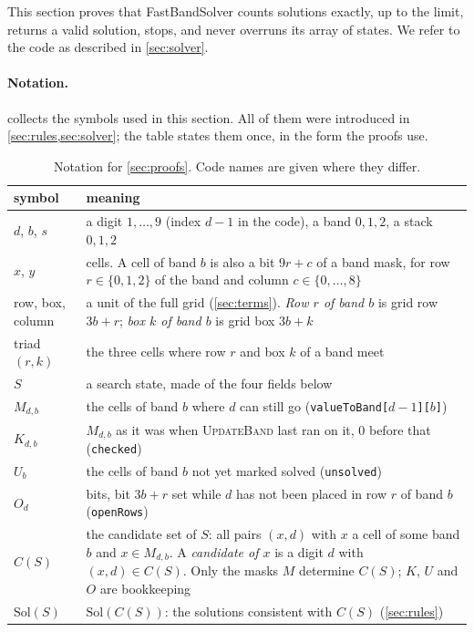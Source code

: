 \documentclass[11pt]{article}
\theoremstyle{definition}
\theoremstyle{plain}
\let\origtextsc\textsc
\renewcommand{\textsc}[1]{\textup{\origtextsc{#1}}}
\begin{document}
This section proves that FastBandSolver counts solutions exactly, up to the limit, returns a valid solution, stops,
and never overruns its array of states. We refer to the code as described in \cref{sec:solver}.

\paragraph{Notation.}  collects the symbols used in this section. All of them were introduced in
\cref{sec:rules,sec:solver}; the table states them once, in the form the proofs use.

\begin{table}[h!]
\centering
\caption{Notation for \cref{sec:proofs}. Code names are given where they differ.}
\label{tab:notation}
\small
\begin{tabular}{l>{\raggedright\arraybackslash}p{11.2cm}}
\toprule
symbol & meaning \\
\midrule
$d$, $b$, $s$ & a digit $1,\dots,9$ (index $d-1$ in the code), a band $0,1,2$, a stack $0,1,2$ \\
$x$, $y$ & cells. A cell of band $b$ is also a bit $9r+c$ of a band mask, for row $r\in\{0,1,2\}$ of the band and
  column $c\in\{0,\dots,8\}$ \\
row, box, column & a unit of the full grid (\cref{sec:terms}). \emph{Row $r$ of band $b$} is grid row $3b+r$; \emph{box $k$ of band $b$} is grid box $3b+k$ \\
triad $(r,k)$ & the three cells where row $r$ and box $k$ of a band meet \\
$S$ & a search state, made of the four fields below \\
$M_{d,b}$ & the cells of band $b$ where $d$ can still go (\texttt{valueToBand[$d-1$][$b$]}) \\
$K_{d,b}$ & $M_{d,b}$ as it was when \textsc{UpdateBand} last ran on it, 0 before that (\texttt{checked}) \\
$U_b$ & the cells of band $b$ not yet marked solved (\texttt{unsolved}) \\
$O_d$ & 9 bits, bit $3b+r$ set while $d$ has not been placed in row $r$ of band $b$ (\texttt{openRows}) \\
$C(S)$ & the candidate set of $S$: all pairs $(x,d)$ with $x$ a cell of some band $b$ and $x\in M_{d,b}$. A
  \emph{candidate of $x$} is a digit $d$ with $(x,d)\in C(S)$. Only the masks $M$ determine $C(S)$; $K$, $U$ and
  $O$ are bookkeeping \\
$\mathrm{Sol}(S)$ & $\mathrm{Sol}(C(S))$: the solutions consistent with $C(S)$ (\cref{sec:rules}) \\

\end{tabular}
\end{table}
\end{document}
